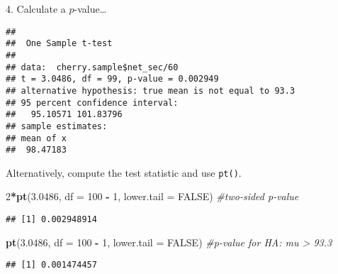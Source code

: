 \documentclass[
  ignorenonframetext,
  aspectratio=169]{beamer}
\newenvironment{Shaded}{\begin{snugshade}}{\end{snugshade}}
\newcommand{\AttributeTok}[1]{\textcolor[rgb]{0.13,0.29,0.53}{#1}}
\newcommand{\CommentTok}[1]{\textcolor[rgb]{0.56,0.35,0.01}{\textit{#1}}}
\newcommand{\ConstantTok}[1]{\textcolor[rgb]{0.56,0.35,0.01}{#1}}
\newcommand{\DecValTok}[1]{\textcolor[rgb]{0.00,0.00,0.81}{#1}}
\newcommand{\FloatTok}[1]{\textcolor[rgb]{0.00,0.00,0.81}{#1}}
\newcommand{\FunctionTok}[1]{\textcolor[rgb]{0.13,0.29,0.53}{\textbf{#1}}}
\newcommand{\NormalTok}[1]{#1}
\newcommand{\SpecialCharTok}[1]{\textcolor[rgb]{0.81,0.36,0.00}{\textbf{#1}}}
\newcommand{\StringTok}[1]{\textcolor[rgb]{0.31,0.60,0.02}{#1}}
\begin{document}
\begin{frame}[fragile]{4. Calculate a \(p\)-value\ldots{}}
\protect\hypertarget{calculate-a-p-value-2}{}
\scriptsize

\begin{Shaded}
\end{Shaded}

\begin{verbatim}
## 
##  One Sample t-test
## 
## data:  cherry.sample$net_sec/60
## t = 3.0486, df = 99, p-value = 0.002949
## alternative hypothesis: true mean is not equal to 93.3
## 95 percent confidence interval:
##   95.10571 101.83796
## sample estimates:
## mean of x 
##  98.47183
\end{verbatim}

\footnotesize

Alternatively, compute the test statistic and use \texttt{pt()}.

\scriptsize

\begin{Shaded}
\begin{Highlighting}[]
\DecValTok{2}\SpecialCharTok{*}\FunctionTok{pt}\NormalTok{(}\FloatTok{3.0486}\NormalTok{, }\AttributeTok{df =} \DecValTok{100} \SpecialCharTok{{-}} \DecValTok{1}\NormalTok{, }\AttributeTok{lower.tail =} \ConstantTok{FALSE}\NormalTok{) }\CommentTok{\#two{-}sided p{-}value}
\end{Highlighting}
\end{Shaded}

\begin{verbatim}
## [1] 0.002948914
\end{verbatim}

\begin{Shaded}
\begin{Highlighting}[]
\FunctionTok{pt}\NormalTok{(}\FloatTok{3.0486}\NormalTok{, }\AttributeTok{df =} \DecValTok{100} \SpecialCharTok{{-}} \DecValTok{1}\NormalTok{, }\AttributeTok{lower.tail =} \ConstantTok{FALSE}\NormalTok{) }\CommentTok{\#p{-}value for HA: mu \textgreater{} 93.3}
\end{Highlighting}
\end{Shaded}

\begin{verbatim}
## [1] 0.001474457
\end{verbatim}
\end{frame}
\end{document}
